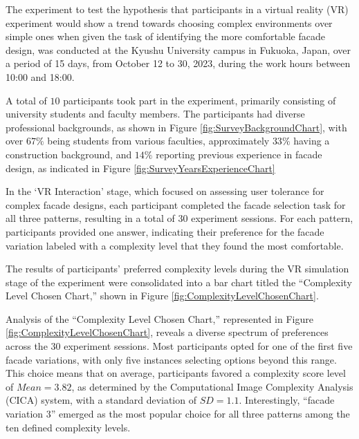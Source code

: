 


The experiment to test the hypothesis that participants in a virtual reality (VR) experiment would show a trend towards choosing complex environments over simple ones when given the task of identifying the more comfortable facade design, was conducted at the Kyushu University campus in Fukuoka, Japan, over a period of 15 days, from October 12 to 30, 2023, during the work hours between 10:00 and 18:00.

A total of \(10\) participants took part in the experiment, primarily consisting of university students and faculty members.
The participants had diverse professional backgrounds, as shown in Figure \ref{fig:SurveyBackgroundChart}, with over \(67\%\) being students from various faculties, approximately \(33\%\) having a construction background, and \(14\%\) reporting previous experience in facade design, as indicated in Figure \ref{fig:SurveyYearsExperienceChart}

In the `VR Interaction' stage, which focused on assessing user tolerance for complex facade designs, each participant completed the facade selection task for all three patterns, resulting in a total of 30 experiment sessions.
For each pattern, participants provided one answer, indicating their preference for the facade variation labeled with a complexity level that they found the most comfortable.


The results of participants' preferred complexity levels during the VR simulation stage of the experiment were consolidated into a bar chart titled the ``Complexity Level Chosen Chart,'' shown in Figure \ref{fig:ComplexityLevelChosenChart}.

Analysis of the ``Complexity Level Chosen Chart,'' represented in Figure \ref{fig:ComplexityLevelChosenChart}, reveals a diverse spectrum of preferences across the 30 experiment sessions.
Most participants opted for one of the first five facade variations, with only five instances selecting options beyond this range.
This choice means that on average, participants favored a complexity score level of \(Mean = 3.82\), as determined by the Computational Image Complexity Analysis (CICA) system, with a standard deviation of \(SD = 1.1\).
 Interestingly, ``facade variation 3'' emerged as the most popular choice for all three patterns among the ten defined complexity levels.

